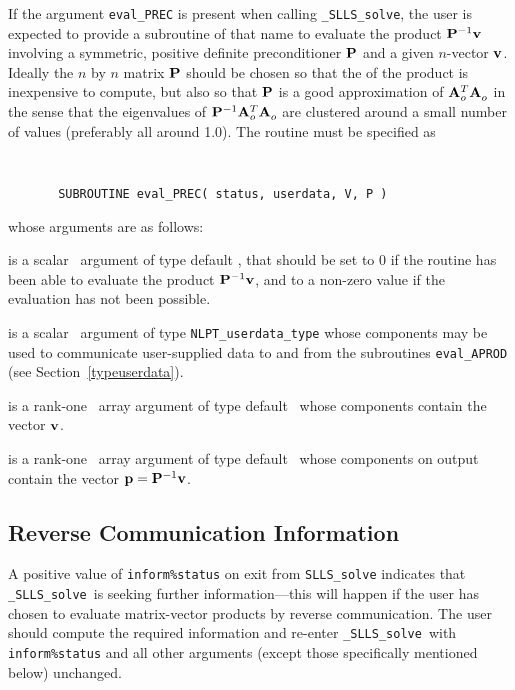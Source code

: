 \documentclass{galahad}
\newcommand{\packagename}{SLLS}
\newcommand{\fullpackagename}{\libraryname\_\packagename}
\newcommand{\solver}{{\tt \fullpackagename\_solve}}
\begin{document}
If the argument {\tt eval\_PREC} is present when calling \solver, the
user is expected to provide a subroutine of that name to evaluate the
product ${\mathbf{P}}^{-1} {\mathbf{v}}$ involving a symmetric, positive definite 
preconditioner ${\mathbf{P}}$ and a given $n$-vector ${\mathbf{v}}$.
Ideally the $n$ by $n$ matrix ${\mathbf{P}}$ should be chosen so that the
of the product is inexpensive to compute, but also so that ${\mathbf{P}}$ is
a good approximation of ${\mathbf{A}}_o^T {\mathbf{A}}_o^{}$ in the sense that the eigenvalues
of ${\mathbf{P}}^{-1} {\mathbf{A}}_o^T {\mathbf{A}}_o^{}$ are clustered around a small number of values
(preferably all around 1.0). The routine must be specified as

\def\baselinestretch{0.8}
{\tt
\begin{verbatim}
       SUBROUTINE eval_PREC( status, userdata, V, P )
\end{verbatim} }
\def\baselinestretch{1.0}
\noindent whose arguments are as follows:

\begin{description}
 is a scalar \intentout\ argument of type default \integer,
that should be set to 0 if the routine has been able to evaluate the
product ${\mathbf{P}}^{-1} {\mathbf{v}}$, 
and to a non-zero value if the evaluation has not been possible.

 is a scalar \intentinout\ argument of type
{\tt NLPT\_userdata\_type} whose components may be used
to communicate user-supplied data to and from the subroutines
{\tt eval\_APROD}
(see Section~\ref{typeuserdata}).

 is a rank-one \intentin\ array argument of type default \realdp\
whose components contain the vector ${\mathbf{v}}$.

 is a rank-one \intentinout\ array argument of type default \realdp\
whose components on output contain the vector ${\mathbf{p}} = {\mathbf{P}}^{-1} {\mathbf{v}}$.

\end{description}



\subsection{\label{reverse}Reverse Communication Information}

A positive value of {\tt inform\%status} on exit from
{\tt \packagename\_solve}
indicates that
\solver\ is seeking further information---this will happen
if the user has chosen to evaluate matrix-vector products by
reverse communication.
The user should compute the required information and re-enter \solver\
with {\tt inform\%status} and all other arguments (except those specifically
mentioned below) unchanged.
\end{document}
